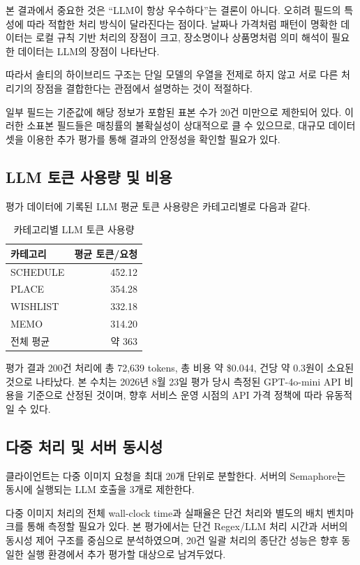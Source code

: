 \documentclass[11pt,a4paper]{article}
\begin{document}
본 결과에서 중요한 것은 ``LLM이 항상 우수하다''는 결론이 아니다. 오히려 필드의 특성에 따라 적합한 처리 방식이 달라진다는 점이다. 날짜나 가격처럼 패턴이 명확한 데이터는 로컬 규칙 기반 처리의 장점이 크고, 장소명이나 상품명처럼 의미 해석이 필요한 데이터는 LLM의 장점이 나타난다.

따라서 솔티의 하이브리드 구조는 단일 모델의 우열을 전제로 하지 않고 서로 다른 처리기의 장점을 결합한다는 관점에서 설명하는 것이 적절하다.

일부 필드는 기준값에 해당 정보가 포함된 표본 수가 20건 미만으로 제한되어 있다. 이러한 소표본 필드들은 매칭률의 불확실성이 상대적으로 클 수 있으므로, 대규모 데이터셋을 이용한 추가 평가를 통해 결과의 안정성을 확인할 필요가 있다.

\subsection{LLM 토큰 사용량 및 비용}

평가 데이터에 기록된 LLM 평균 토큰 사용량은 카테고리별로 다음과 같다.

\begin{table}[H]
\centering
\small
\begin{tabularx}{0.85\linewidth}{l r}
\toprule
\textbf{카테고리} & \textbf{평균 토큰/요청}\\
\midrule
SCHEDULE & 452.12\\
PLACE & 354.28\\
WISHLIST & 332.18\\
MEMO & 314.20\\
\midrule
전체 평균 & 약 363\\
\bottomrule
\end{tabularx}
\caption{카테고리별 LLM 토큰 사용량}
\end{table}

평가 결과 200건 처리에 총 72,639 tokens, 총 비용 약 \$0.044, 건당 약 0.3원이 소요된 것으로 나타났다. 본 수치는 2026년 8월 23일 평가 당시 측정된 GPT-4o-mini API 비용을 기준으로 산정된 것이며, 향후 서비스 운영 시점의 API 가격 정책에 따라 유동적일 수 있다.

\subsection{다중 처리 및 서버 동시성}

클라이언트는 다중 이미지 요청을 최대 20개 단위로 분할한다. 서버의 Semaphore는 동시에 실행되는 LLM 호출을 3개로 제한한다.


다중 이미지 처리의 전체 wall-clock time과 실패율은 단건 처리와 별도의 배치 벤치마크를 통해 측정할 필요가 있다. 본 평가에서는 단건 Regex/LLM 처리 시간과 서버의 동시성 제어 구조를 중심으로 분석하였으며, 20건 일괄 처리의 종단간 성능은 향후 동일한 실행 환경에서 추가 평가할 대상으로 남겨두었다.
\end{document}
